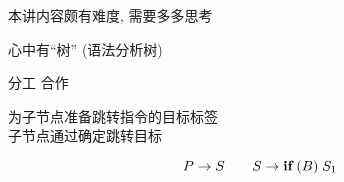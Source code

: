 
\begin{frame}{}
  \begin{center}
    \begin{center}
      本讲内容颇有难度, 需要多多思考
    \end{center}
  \end{center}
\end{frame}

\begin{frame}
  \begin{center}
    心中有``树'' (语法分析树)
  \end{center}
\end{frame}

\begin{frame}{}
  \begin{center}
    {\Large 分工 \qquad 合作}

    \vspace{0.20cm}
  \end{center}

  \begin{center}
    为子节点准备跳转指令的目标标签 \\[5pt]
    子节点通过确定跳转目标
  \end{center}

  \vspace{-0.30cm}
  \[
    P \to S \qquad S \to \texttt{\bf if}\; (B)\; S_{1}
  \]
\end{frame}

\begin{frame}{}
\end{frame}

\begin{frame}{}
\end{frame}
